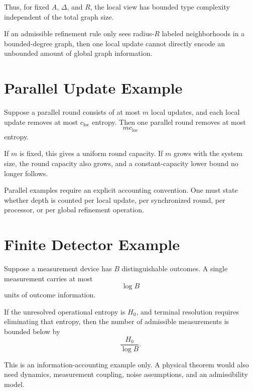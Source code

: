Thus, for fixed \(A\), \(\Delta\), and \(R\), the local view has bounded type
complexity independent of the total graph size.

\begin{example}
If an admissible refinement rule only sees radius-\(R\) labeled neighborhoods
in a bounded-degree graph, then one local update cannot directly encode an
unbounded amount of global graph information.
\end{example}

\section{Parallel Update Example}

Suppose a parallel round consists of at most \(m\) local updates, and each
local update removes at most \(c_{\mathrm{loc}}\) entropy. Then one parallel
round removes at most
\[
mc_{\mathrm{loc}}
\]
entropy.

If \(m\) is fixed, this gives a uniform round capacity. If \(m\) grows with
the system size, the round capacity also grows, and a constant-capacity lower
bound no longer follows.

\begin{remark}
Parallel examples require an explicit accounting convention. One must state
whether depth is counted per local update, per synchronized round, per
processor, or per global refinement operation.
\end{remark}

\section{Finite Detector Example}

Suppose a measurement device has \(B\) distinguishable outcomes. A single
measurement carries at most
\[
\log B
\]
units of outcome information.

If the unresolved operational entropy is \(H_0\), and terminal resolution
requires eliminating that entropy, then the number of admissible measurements
is bounded below by
\[
\frac{H_0}{\log B}.
\]

\begin{remark}
This is an information-accounting example only. A physical theorem would also
need dynamics, measurement coupling, noise assumptions, and an admissibility
model.
\end{remark}

